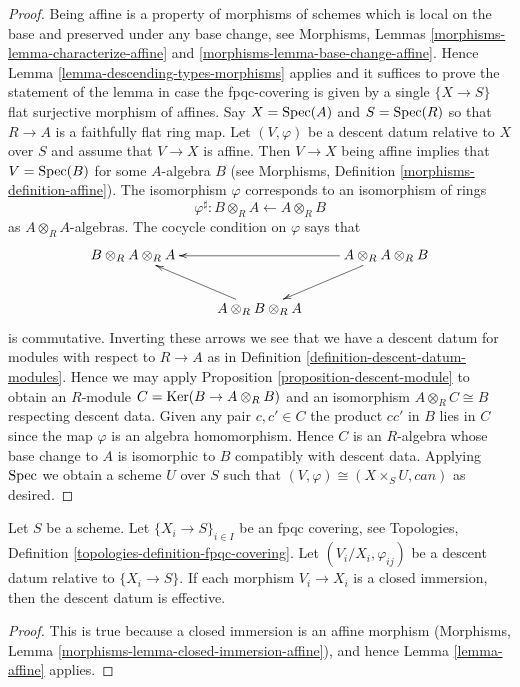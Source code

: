 \begin{proof}
Being affine is a property of morphisms of schemes
which is local on the base and preserved under any base change, see
Morphisms, Lemmas \ref{morphisms-lemma-characterize-affine} and
\ref{morphisms-lemma-base-change-affine}.
Hence Lemma \ref{lemma-descending-types-morphisms} applies
and it suffices to prove the statement of the lemma
in case the fpqc-covering is given by a single
$\{X \to S\}$ flat surjective morphism of affines.
Say $X = \mathop{\mathrm{Spec}}(A)$ and $S = \mathop{\mathrm{Spec}}(R)$ so
that $R \to A$ is a faithfully flat ring map.
Let $(V, \varphi)$ be a descent datum relative to $X$ over $S$
and assume that $V \to X$ is affine.
Then $V \to X$ being affine implies that $V = \mathop{\mathrm{Spec}}(B)$
for some $A$-algebra $B$ (see
Morphisms, Definition \ref{morphisms-definition-affine}).
The isomorphism $\varphi$ corresponds to an isomorphism
of rings
$$
\varphi^\sharp :
B \otimes_R A \longleftarrow A \otimes_R B
$$
as $A \otimes_R A$-algebras. The cocycle condition on $\varphi$
says that
$$
\xymatrix{
B \otimes_R A \otimes_R A & &
A \otimes_R A \otimes_R B \ar[ll] \ar[ld]\\
& A \otimes_R B \otimes_R A \ar[lu] &
}
$$
is commutative. Inverting these arrows we see that we have a
descent datum for modules with respect to $R \to A$ as in
Definition \ref{definition-descent-datum-modules}.
Hence we may apply Proposition \ref{proposition-descent-module}
to obtain an $R$-module
$C = \mathop{\mathrm{Ker}}(B \to A \otimes_R B)$
and an isomorphism $A \otimes_R C \cong B$
respecting descent data. Given any pair $c, c' \in C$
the product $cc'$ in $B$ lies in $C$ since the
map $\varphi$ is an algebra homomorphism. Hence
$C$ is an $R$-algebra whose base change to $A$ is
isomorphic to $B$ compatibly with descent data.
Applying $\mathop{\mathrm{Spec}}$ we obtain a scheme
$U$ over $S$ such that $(V, \varphi) \cong (X \times_S U, can)$
as desired.
\end{proof}

\begin{lemma}
\label{lemma-closed-immersion}
Let $S$ be a scheme.
Let $\{X_i \to S\}_{i\in I}$ be an fpqc covering, see
Topologies, Definition \ref{topologies-definition-fpqc-covering}.
Let $(V_i/X_i, \varphi_{ij})$ be a descent datum
relative to $\{X_i \to S\}$. If each morphism
$V_i \to X_i$ is a closed immersion, then the descent datum is
effective.
\end{lemma}

\begin{proof}
This is true because a closed immersion is an affine morphism
(Morphisms, Lemma \ref{morphisms-lemma-closed-immersion-affine}),
and hence Lemma \ref{lemma-affine} applies.
\end{proof}


